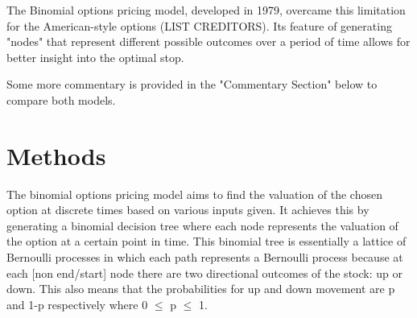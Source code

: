 \documentclass[12pt, letterpaper]{article}
\begin{document}
The Binomial options pricing model, developed in 1979, overcame this limitation for the American-style options (LIST CREDITORS).
Its feature of generating "nodes" that represent different possible outcomes over a period of time allows for better insight into the optimal stop.

Some more commentary is provided in the "Commentary Section" below to compare both models.

\pagebreak

\section*{Methods}

The binomial options pricing model aims to find the valuation of the chosen option at discrete times based on various inputs given.
It achieves this by generating a binomial decision tree where each node represents the valuation of the option at a certain point in time.
This binomial tree is essentially a lattice of Bernoulli processes in which each path represents a Bernoulli process because at each [non end/start] node there are two directional outcomes of the stock: up or down.
This also means that the probabilities for up and down movement are p and 1-p respectively where 0 $\leq$ p $\leq$ 1.
\end{document}
